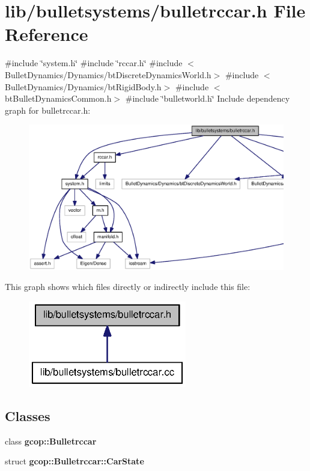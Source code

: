 \section{lib/bulletsystems/bulletrccar.h \-File \-Reference}
\label{bulletrccar_8h}
{\ttfamily \#include \char`\"{}system.\-h\char`\"{}}\*
{\ttfamily \#include \char`\"{}rccar.\-h\char`\"{}}\*
{\ttfamily \#include $<$\-Bullet\-Dynamics/\-Dynamics/bt\-Discrete\-Dynamics\-World.\-h$>$}\*
{\ttfamily \#include $<$\-Bullet\-Dynamics/\-Dynamics/bt\-Rigid\-Body.\-h$>$}\*
{\ttfamily \#include $<$bt\-Bullet\-Dynamics\-Common.\-h$>$}\*
{\ttfamily \#include \char`\"{}bulletworld.\-h\char`\"{}}\*
\-Include dependency graph for bulletrccar.\-h\-:
\nopagebreak
\begin{figure}[H]
\begin{center}
\leavevmode
\includegraphics[width=350pt]{bulletrccar_8h__incl}
\end{center}
\end{figure}
\-This graph shows which files directly or indirectly include this file\-:
\nopagebreak
\begin{figure}[H]
\begin{center}
\leavevmode
\includegraphics[width=196pt]{bulletrccar_8h__dep__incl}
\end{center}
\end{figure}
\subsection*{\-Classes}
\begin{DoxyCompactItemize}
\item 
class {\bf gcop\-::\-Bulletrccar}
\item 
struct {\bf gcop\-::\-Bulletrccar\-::\-Car\-State}
\end{DoxyCompactItemize}

